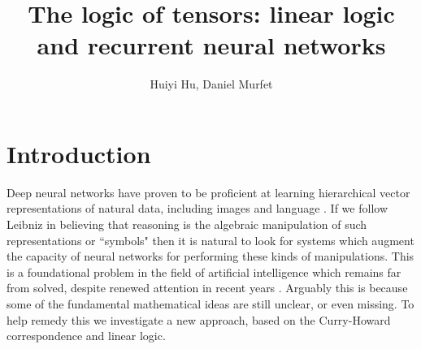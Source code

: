 \documentclass[english,letter paper,12pt,leqno]{article}
\theoremstyle{example}
\numberwithin{equation}{section}
\def\res{\operatorname{Res}}
\begin{document}
\def\Res{\res\!}
\newcommand{\ud}{\mathrm{d}}
\newcommand{\Ress}[1]{\res_{#1}\!}
\newcommand{\cat}[1]{\mathcal{#1}}
\newcommand{\lto}{\longrightarrow}
\newcommand{\xlto}[1]{\stackrel{#1}\lto}
\newcommand{\mf}[1]{\mathfrak{#1}}
\newcommand{\md}[1]{\mathscr{#1}}
\def\sus{\l}
\def\l{\,|\,}
\def\sgn{\textup{sgn}}
\newcommand{\den}[1]{\llbracket #1 \rrbracket}
\def\inta{\textbf{int}}
\def\binta{\textbf{bint}}
\def\boola{\textbf{bool}}
\def\comp{\underline{\textup{comp}}}
\def\mult{\underline{\textup{mult}}}
\def\repeat{\underline{\textup{repeat}}}
\def\master{\underline{\textup{master}}}
\def\feed{\underline{\textup{feed}}}
\def\relu{\sigma}
\def\softmax{\sigma_{soft}}
\def\sigmoid{\sigma_{sigm}}

\DeclarePairedDelimiter\bra{\langle}{\rvert}
\DeclarePairedDelimiter\ket{\lvert}{\rangle}

\title{The logic of tensors: linear logic and recurrent neural networks}
\author{Huiyi Hu, Daniel Murfet}

\maketitle

\tableofcontents

\section{Introduction}

Deep neural networks have proven to be proficient at learning hierarchical vector representations of natural data, including images and language \cite{dlnature}. If we follow Leibniz \cite{frege} in believing that reasoning is the algebraic manipulation of such representations or ``symbols" then it is natural to look for systems which augment the capacity of neural networks for performing these kinds of manipulations. This is a foundational problem in the field of artificial intelligence which remains far from solved, despite renewed attention in recent years \cite{ntm, joulin, dnc, graves_etal, grefen, weston, tarlow, freitas, neuralprog}. Arguably this is because some of the fundamental mathematical ideas are still unclear, or even missing. To help remedy this we investigate a new approach, based on the Curry-Howard correspondence and linear logic.
\end{document}
